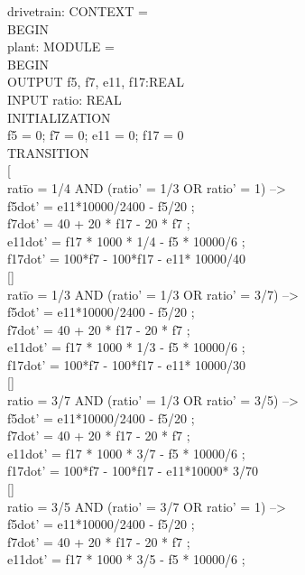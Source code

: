 \documentclass{llncs}
\begin{document}
\begin{figure}[htb!]
\begin{tt}
\begin{tabbing}
drivetrain: CONTEXT = 
\\
BEGIN
\\
plant: MODULE =
\\
BEGIN
\\
OUTPUT f5, f7, e11, f17:REAL
\\
INPUT ratio: REAL
\\
INI\=TIALIZATION
\\ \>
  f5 = 0; f7 = 0; e11 = 0; f17 = 0
\\
TRANSITION
\\
\mbox{[}
\\
rat\=io = 1/4 AND (ratio' = 1/3 OR ratio' = 1) -->
\+
\\ 
  f5dot' = e11*10000/2400 - f5/20 ;
\\
  f7dot' = 40 + 20 * f17 - 20 * f7 ;
\\
  e11dot' = f17 * 1000 * 1/4 - f5 * 10000/6 ;
\\
  f17dot' = 100*f7 - 100*f17 - e11* 10000/40
\-
\\ 
 \mbox{[]}
\\ 
rat\=io = 1/3 AND (ratio' = 1/3 OR ratio' = 3/7) --> 
\\ \>
  f5dot' = e11*10000/2400 - f5/20 ;
\\ \>
  f7dot' = 40 + 20 * f17 - 20 * f7 ;
\\ \>
  e11dot' = f17 * 1000 * 1/3 - f5 * 10000/6 ;
\\ \>
  f17dot' = 100*f7 - 100*f17 - e11* 10000/30
\\
 \mbox{[]}
\\
ratio = 3/7 AND (ratio' = 1/3 OR ratio' = 3/5) --> 
\\ \>
  f5dot' = e11*10000/2400 - f5/20 ;
\\ \>
  f7dot' = 40 + 20 * f17 - 20 * f7 ;
\\ \>
  e11dot' = f17 * 1000 * 3/7 - f5 * 10000/6 ;
\\ \>
  f17dot' = 100*f7 - 100*f17 - e11*10000* 3/70
\\
 \mbox{[]}
\\
ratio = 3/5 AND (ratio' = 3/7 OR ratio' = 1) --> 
\\ \>
  f5dot' = e11*10000/2400 - f5/20 ;
\\ \>
  f7dot' = 40 + 20 * f17 - 20 * f7 ;
\\ \>
  e11dot' = f17 * 1000 * 3/5 - f5 * 10000/6 ;
\\ \>

\end{tabbing}
\end{tt}
\end{figure}
\end{document}
